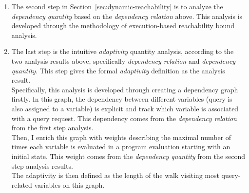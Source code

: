 \begin{enumerate}
\begin{enumerate}
   \item The second step in Section~\ref{sec:dynamic-reachability} is to analyze the \emph{dependency quantity} 
  based on the \emph{dependency relation} above.
  This analysis is developed through the methodology of execution-based reachability bound analysis.
   \item The last step is the intuitive \emph{adaptivity} quantity analysis, 
   according to the two analysis results above, specifically \emph{dependency relation} and \emph{dependency quantity}.
   This step 
  gives the formal \emph{adaptivity} definition as the analysis result. 
  \\
  Specifically, this analysis is developed through creating a dependency graph firstly. 
  In this graph, the dependency between different variables (query is also assigned to a variable) 
  is explicit and track which variable is associated with a query request. 
  This dependency comes from the \emph{dependency relation} from the first step analysis.
  \\
 Then, I enrich this graph with 
 weights describing the maximal number of times each variable is evaluated in a program evaluation starting with an initial state. 
 This weight comes from the \emph{dependency quantity} from the second step analysis results.
 \\
  The adaptivity is then defined as the length of the walk visiting most query-related variables on this graph. 
      \end{enumerate}

\end{enumerate}
